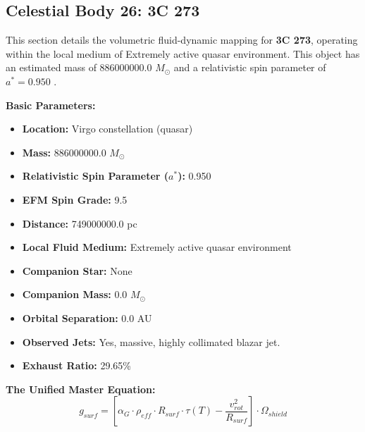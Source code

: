 \documentclass[11pt, a4paper]{article}
\begin{document}
\clearpage
\subsection{Celestial Body 26: 3C 273}
This section details the volumetric fluid-dynamic mapping for \textbf{3C 273}, operating within the local medium of Extremely active quasar environment. This object has an estimated mass of 886000000.0 $M_{\odot}$ and a relativistic spin parameter of $a^* = 0.950$ \cite{paltani2005, ned}.

\vspace{0.5em}
\noindent \textbf{Basic Parameters:}
\begin{itemize}
  \item \textbf{Location:} Virgo constellation (quasar)
  \item \textbf{Mass:} 886000000.0 $M_{\odot}$
  \item \textbf{Relativistic Spin Parameter ($a^*$):} 0.950
  \item \textbf{EFM Spin Grade:} 9.5
  \item \textbf{Distance:} 749000000.0 pc
  \item \textbf{Local Fluid Medium:} Extremely active quasar environment
  \item \textbf{Companion Star:} None
  \item \textbf{Companion Mass:} 0.0 $M_{\odot}$
  \item \textbf{Orbital Separation:} 0.0 AU
  \item \textbf{Observed Jets:} Yes, massive, highly collimated blazar jet.
  \item \textbf{Exhaust Ratio:} 29.65\%
\end{itemize}

\vspace{0.5em}
\noindent \textbf{The Unified Master Equation:}
$$ g_{surf} = \left[ \alpha_G \cdot \rho_{eff} \cdot R_{surf} \cdot \tau(T) - \frac{v_{rot}^2}{R_{surf}} \right] \cdot \Omega_{shield} $$
\end{document}

